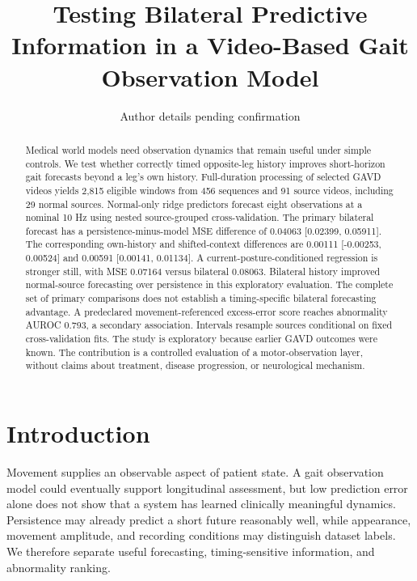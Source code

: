 \documentclass[letterpaper]{article}
\title{Testing Bilateral Predictive Information in a Video-Based Gait Observation Model}
\author{Author details pending confirmation}
\begin{document}
\maketitle

\begin{abstract}

Medical world models need observation dynamics that remain useful under simple controls. We test whether correctly timed opposite-leg history improves short-horizon gait forecasts beyond a leg's own history. Full-duration processing of selected GAVD videos yields 2,815 eligible windows from 456 sequences and 91 source videos, including 29 normal sources. Normal-only ridge predictors forecast eight observations at a nominal 10 Hz using nested source-grouped cross-validation. The primary bilateral forecast has a persistence-minus-model MSE difference of 0.04063 [0.02399, 0.05911]. The corresponding own-history and shifted-context differences are 0.00111 [-0.00253, 0.00524] and 0.00591 [0.00141, 0.01134]. A current-posture-conditioned regression is stronger still, with MSE 0.07164 versus bilateral 0.08063. Bilateral history improved normal-source forecasting over persistence in this exploratory evaluation. The complete set of primary comparisons does not establish a timing-specific bilateral forecasting advantage. A predeclared movement-referenced excess-error score reaches abnormality AUROC 0.793, a secondary association. Intervals resample sources conditional on fixed cross-validation fits. The study is exploratory because earlier GAVD outcomes were known. The contribution is a controlled evaluation of a motor-observation layer, without claims about treatment, disease progression, or neurological mechanism.

\end{abstract}

\section{Introduction}

Movement supplies an observable aspect of patient state. A gait observation model could eventually support longitudinal assessment, but low prediction error alone does not show that a system has learned clinically meaningful dynamics. Persistence may already predict a short future reasonably well, while appearance, movement amplitude, and recording conditions may distinguish dataset labels. We therefore separate useful forecasting, timing-sensitive information, and abnormality ranking.
\end{document}
